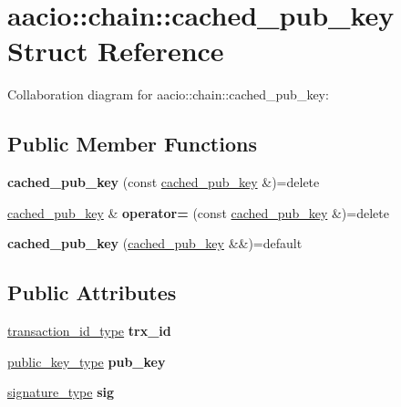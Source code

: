 \hypertarget{structaacio_1_1chain_1_1cached__pub__key}{}\section{aacio\+:\+:chain\+:\+:cached\+\_\+pub\+\_\+key Struct Reference}
\label{structaacio_1_1chain_1_1cached__pub__key}


Collaboration diagram for aacio\+:\+:chain\+:\+:cached\+\_\+pub\+\_\+key\+:
\subsection*{Public Member Functions}
\begin{DoxyCompactItemize}
\item 
\mbox{\label{structaacio_1_1chain_1_1cached__pub__key_aefb938592c2cf960e51c1408e9b09110}} 
{\bfseries cached\+\_\+pub\+\_\+key} (const \mbox{\hyperlink{structaacio_1_1chain_1_1cached__pub__key}{cached\+\_\+pub\+\_\+key}} \&)=delete
\item 
\mbox{\label{structaacio_1_1chain_1_1cached__pub__key_a94b71b644c4f19a4a3f379d78044201d}} 
\mbox{\hyperlink{structaacio_1_1chain_1_1cached__pub__key}{cached\+\_\+pub\+\_\+key}} \& {\bfseries operator=} (const \mbox{\hyperlink{structaacio_1_1chain_1_1cached__pub__key}{cached\+\_\+pub\+\_\+key}} \&)=delete
\item 
\mbox{\label{structaacio_1_1chain_1_1cached__pub__key_a1adafe6b712e55f08c54f813bca2e5f9}} 
{\bfseries cached\+\_\+pub\+\_\+key} (\mbox{\hyperlink{structaacio_1_1chain_1_1cached__pub__key}{cached\+\_\+pub\+\_\+key}} \&\&)=default
\end{DoxyCompactItemize}
\subsection*{Public Attributes}
\begin{DoxyCompactItemize}
\item 
\mbox{\label{structaacio_1_1chain_1_1cached__pub__key_ade0ce91e2c20660ee4c48ac49589a68f}} 
\mbox{\hyperlink{classfc_1_1sha256}{transaction\+\_\+id\+\_\+type}} {\bfseries trx\+\_\+id}
\item 
\mbox{\label{structaacio_1_1chain_1_1cached__pub__key_a53402ddae4ba45d5157f7ec0874d5ccf}} 
\mbox{\hyperlink{classfc_1_1crypto_1_1public__key}{public\+\_\+key\+\_\+type}} {\bfseries pub\+\_\+key}
\item 
\mbox{\label{structaacio_1_1chain_1_1cached__pub__key_a67635774738e1b72ec1ffdc28753d5da}} 
\mbox{\hyperlink{classfc_1_1crypto_1_1signature}{signature\+\_\+type}} {\bfseries sig}
\end{DoxyCompactItemize}


